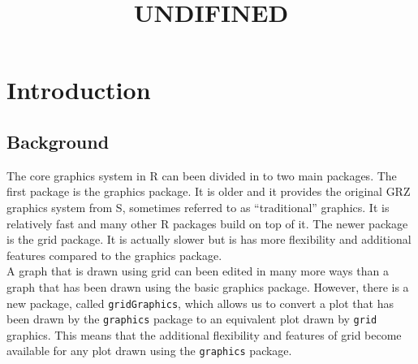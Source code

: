 \documentclass[a4paper,10pt]{article}
\begin{document}


\title{UNDIFINED}
\maketitle
\section{Introduction}
\subsection{Background}
The core graphics system in R can been divided in to two main packages. The first package is the graphics package. It is older and it provides the original GRZ graphics system from S, sometimes referred to as ``traditional'' graphics. It is relatively fast and many other R packages build on top of it. The newer package is the grid package. It is actually slower but is has more flexibility and additional features compared to the graphics package. \\
A graph that is drawn using grid can been edited in many more ways than a graph that has been drawn using the basic graphics package. However, there is a new package, called \texttt{gridGraphics}, which allows us to convert a plot that has been drawn by the \texttt{graphics} package to an equivalent plot drawn by \texttt{grid} graphics. This means that the additional flexibility and features of grid become available for any plot drawn using the \texttt{graphics} package. \\
\end{document}
